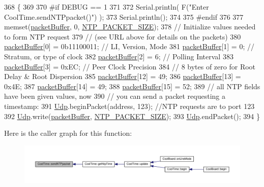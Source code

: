 \begin{DoxyCode}
368 \{
369 
370 \textcolor{preprocessor}{#if DEBUG == 1 }
371 
372     Serial.println( F(\textcolor{stringliteral}{"Enter CoolTime.sendNTPpacket()"}) );
373     Serial.println();
374 
375 \textcolor{preprocessor}{#endif}
376 
377     memset(\hyperlink{classCoolTime_a27e6abc82a5c2f72161956967005bec7}{packetBuffer}, 0, \hyperlink{CoolTime_8h_a56a6ea64006651b4f42adf713e244f06}{NTP\_PACKET\_SIZE});
378     \textcolor{comment}{// Initialize values needed to form NTP request}
379     \textcolor{comment}{// (see URL above for details on the packets)}
380     \hyperlink{classCoolTime_a27e6abc82a5c2f72161956967005bec7}{packetBuffer}[0] = 0b11100011;   \textcolor{comment}{// LI, Version, Mode}
381     \hyperlink{classCoolTime_a27e6abc82a5c2f72161956967005bec7}{packetBuffer}[1] = 0;     \textcolor{comment}{// Stratum, or type of clock}
382     \hyperlink{classCoolTime_a27e6abc82a5c2f72161956967005bec7}{packetBuffer}[2] = 6;     \textcolor{comment}{// Polling Interval}
383     \hyperlink{classCoolTime_a27e6abc82a5c2f72161956967005bec7}{packetBuffer}[3] = 0xEC;  \textcolor{comment}{// Peer Clock Precision}
384     \textcolor{comment}{// 8 bytes of zero for Root Delay & Root Dispersion}
385     \hyperlink{classCoolTime_a27e6abc82a5c2f72161956967005bec7}{packetBuffer}[12]  = 49;
386     \hyperlink{classCoolTime_a27e6abc82a5c2f72161956967005bec7}{packetBuffer}[13]  = 0x4E;
387     \hyperlink{classCoolTime_a27e6abc82a5c2f72161956967005bec7}{packetBuffer}[14]  = 49;
388     \hyperlink{classCoolTime_a27e6abc82a5c2f72161956967005bec7}{packetBuffer}[15]  = 52;
389     \textcolor{comment}{// all NTP fields have been given values, now}
390     \textcolor{comment}{// you can send a packet requesting a timestamp:                 }
391     \hyperlink{classCoolTime_a4e23216a8121ca79d0fb019f30884b92}{Udp}.beginPacket(address, 123); \textcolor{comment}{//NTP requests are to port 123}
392     \hyperlink{classCoolTime_a4e23216a8121ca79d0fb019f30884b92}{Udp}.write(\hyperlink{classCoolTime_a27e6abc82a5c2f72161956967005bec7}{packetBuffer}, \hyperlink{CoolTime_8h_a56a6ea64006651b4f42adf713e244f06}{NTP\_PACKET\_SIZE});
393     \hyperlink{classCoolTime_a4e23216a8121ca79d0fb019f30884b92}{Udp}.endPacket(); 
394 \}
\end{DoxyCode}
Here is the caller graph for this function\+:
\nopagebreak
\begin{figure}[H]
\begin{center}
\leavevmode
\includegraphics[width=350pt]{classCoolTime_a236a38d120dc53bc67456d763838c5a1_icgraph}
\end{center}
\end{figure}
\mbox{\label{classCoolTime_ab81ea7fdaace111aa01cc1ec84c6d297}} 
